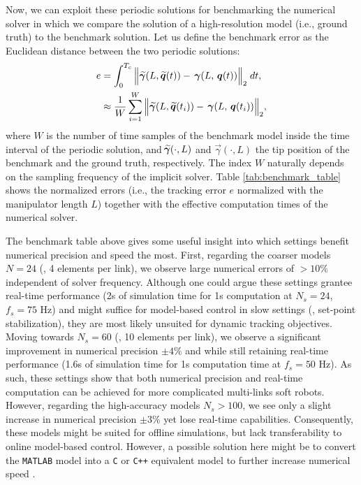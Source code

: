 Now, we can exploit these periodic solutions for benchmarking the numerical solver in which we compare the solution of a high-resolution model (i.e., ground truth) to the benchmark solution. Let us define the benchmark error as the Euclidean distance between the two periodic solutions:
%
\begin{align}
e & = \int^{T_c}_0 \Big\lVert \,\widetilde{\!\boldsymbol{\gamma}}(L,\,\widetilde{\!\boldsymbol{q}}(t)) - \,\boldsymbol{\gamma}(L,\,{\boldsymbol{q}}(t)) \Big \rVert_2 \; dt, \notag \\ & \approx \frac{1}{W}\sum_{i = 1}^{W} \Big\lVert \,\widetilde{\!\boldsymbol{\gamma}}(L,\,\widetilde{\!\boldsymbol{q}}(t_i)) - \,\boldsymbol{\gamma}(L,\,{\boldsymbol{q}}(t_i)) \Big\rVert_2,
\end{align}
%
where $W$ is the number of time samples of the benchmark model inside the time interval of the periodic solution, and $\widetilde{\!\boldsymbol{\gamma}}(\cdot,L)$ and $\vec{\gamma}(\cdot,L)$ the tip position of the benchmark and the ground truth, respectively. The index $W$ naturally depends on the sampling frequency of the implicit solver. Table \ref{tab:benchmark_table} shows the normalized errors (i.e., the tracking error $e$ normalized with the manipulator length $L$) together with the effective computation times of the numerical solver.

The benchmark table above gives some useful insight into which settings benefit numerical precision and speed the most. First, regarding the coarser models $N = 24$ (\ie, 4 elements per link), we observe large numerical errors of $>\!10\%$ independent of solver frequency. Although one could argue these settings grantee real-time performance (2s of simulation time for 1s computation at $N_s = 24$, $f_s = 75$ Hz) and might suffice for model-based control in slow settings (\ie, set-point stabilization), they are most likely unsuited for dynamic tracking objectives. Moving towards $N_s = 60$ (\ie, 10 elements per link), we observe a significant improvement in numerical precision $\pm4\%$ and while still retaining real-time performance (1.6s of simulation time for 1s computation time at $f_s = 50$ Hz). As such, these settings show that both numerical precision and real-time computation can be achieved for more complicated multi-links soft robots. However, regarding the high-accuracy models $N_s > 100$, we see only a slight increase in numerical precision $\pm3\%$ yet lose real-time capabilities. Consequently, these models might be suited for offline simulations, but lack transferability to online model-based control. However, a possible solution here might be to convert the \texttt{MATLAB} model into a \texttt{C} or \texttt{C++} equivalent model to further increase numerical speed \cite{Grazioso2019,Sadati2020}.

